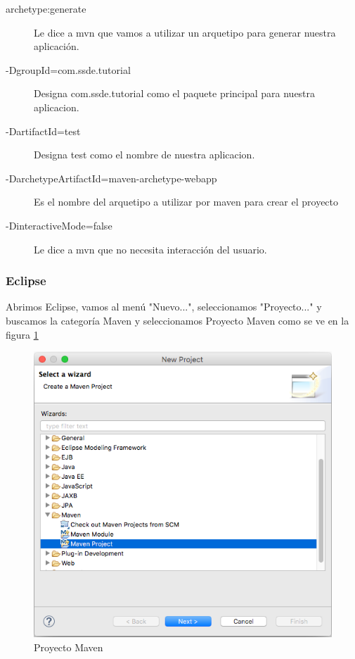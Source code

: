 \documentclass[12pt,a4paper]{article}
\begin{document}
		\begin{description}
		\item [archetype:generate] Le dice a mvn que vamos a utilizar un arquetipo para generar nuestra aplicaci\'on.
		\item[-DgroupId=com.ssde.tutorial] Designa com.ssde.tutorial como el paquete principal para nuestra aplicacion.
		\item[-DartifactId=test] Designa test como el nombre de nuestra aplicacion.
		\item[-DarchetypeArtifactId=maven-archetype-webapp] Es el nombre del arquetipo a utilizar por maven para crear el proyecto
		\item[-DinteractiveMode=false] Le dice a mvn que no necesita interacci\'on del usuario.
		\end{description}

		\subsubsection{Eclipse}
		Abrimos Eclipse, vamos al men\'u "Nuevo...", seleccionamos "Proyecto..." y buscamos la categor\'ia Maven y seleccionamos Proyecto Maven como se ve en la figura \ref{01_nuevo_proyecto}\\ \par
        \begin{figure}[h]
            \centering
            \includegraphics[scale=0.4]{01_nuevo_proyecto}
            \caption{Proyecto Maven}
            \label{01_nuevo_proyecto}
        \end{figure}
        
\end{document}
